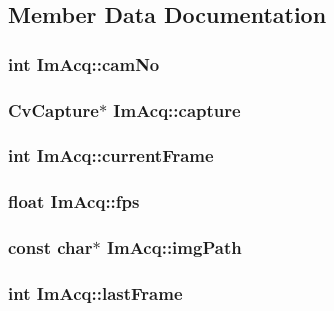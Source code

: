 \subsection{Member Data Documentation}
\hypertarget{struct_im_acq_a9c151285da789cd035360b34d9637831}{
\subsubsection[{camNo}]{\setlength{\rightskip}{0pt plus 5cm}int {\bf ImAcq::camNo}}}
\label{struct_im_acq_a9c151285da789cd035360b34d9637831}
\hypertarget{struct_im_acq_a71a1e8a55bfdf429634751a597a6dcba}{
\subsubsection[{capture}]{\setlength{\rightskip}{0pt plus 5cm}CvCapture$\ast$ {\bf ImAcq::capture}}}
\label{struct_im_acq_a71a1e8a55bfdf429634751a597a6dcba}
\hypertarget{struct_im_acq_a0be9cca3c7dbda6da3ce2752717ce885}{
\subsubsection[{currentFrame}]{\setlength{\rightskip}{0pt plus 5cm}int {\bf ImAcq::currentFrame}}}
\label{struct_im_acq_a0be9cca3c7dbda6da3ce2752717ce885}
\hypertarget{struct_im_acq_ac17ac96f1bb1ef278a70eeaec6e0275f}{
\subsubsection[{fps}]{\setlength{\rightskip}{0pt plus 5cm}float {\bf ImAcq::fps}}}
\label{struct_im_acq_ac17ac96f1bb1ef278a70eeaec6e0275f}
\hypertarget{struct_im_acq_ae389de4997bf71e132171734a7d627eb}{
\subsubsection[{imgPath}]{\setlength{\rightskip}{0pt plus 5cm}const char$\ast$ {\bf ImAcq::imgPath}}}
\label{struct_im_acq_ae389de4997bf71e132171734a7d627eb}
\hypertarget{struct_im_acq_a0afeeee09d54a896433376cf359d209f}{
\subsubsection[{lastFrame}]{\setlength{\rightskip}{0pt plus 5cm}int {\bf ImAcq::lastFrame}}}
